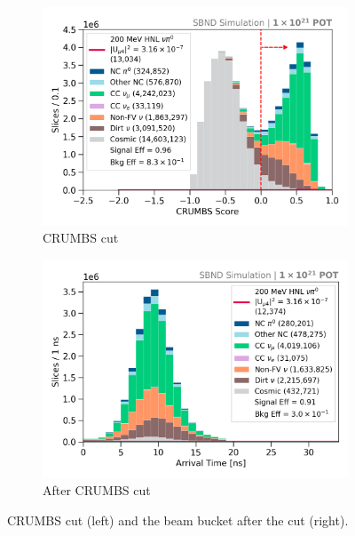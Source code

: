 \begin{figure}[ht!]
        \begin{subfigure}[b]{0.495\textwidth}   
            \centering 
            \includegraphics[width=\textwidth]{crumbs_precut}
            \caption{CRUMBS cut}%
            \label{fig:crumbs_cut}
        \end{subfigure}
        \hfill
        \begin{subfigure}[b]{0.495\textwidth}   
            \centering 
            \includegraphics[width=\textwidth]{beam_bucket_post_crumbs}
            \caption{After CRUMBS cut}%
            \label{fig:bb_crumbs}
        \end{subfigure}
	\caption[CRUMBS Cut]{
		CRUMBS cut (left) and the beam bucket after the cut (right). 
	}
        \label{fig:cosmic_crumbs_cut}
\end{figure}


